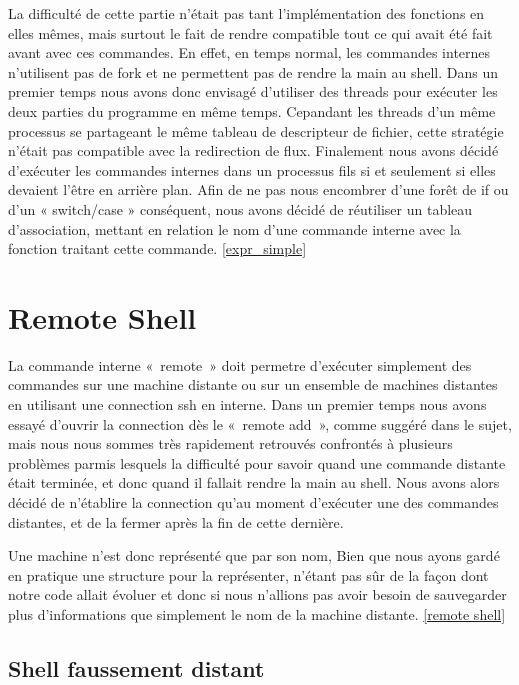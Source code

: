 \documentclass[12pt]{article}
\begin{document}
 La difficulté de cette partie n'était pas tant l'implémentation des fonctions en elles mêmes,
 mais surtout le fait de rendre compatible tout ce qui avait été fait avant avec ces commandes.
 En effet, en temps normal, les commandes internes n'utilisent pas de fork et ne permettent pas
 de rendre la main au shell. Dans un premier temps nous avons donc envisagé d'utiliser des threads
 pour exécuter les deux parties du programme en même temps. Cepandant les threads d'un même processus
 se partageant le même tableau de descripteur de fichier, cette stratégie n'était pas compatible
 avec la redirection de flux. Finalement nous avons décidé d'exécuter les commandes internes dans
 un processus fils si et seulement si elles devaient l'être en arrière plan.
 Afin de ne pas nous encombrer d'une forêt de if ou d'un « switch/case » conséquent, nous avons
 décidé de réutiliser un tableau d'association, mettant en relation le nom d'une commande interne
 avec la fonction traitant cette commande.  \ref{expr_simple}
 

\newpage
\section{Remote Shell}

La commande interne «~remote~» doit permetre d'exécuter simplement des commandes sur une machine
distante ou sur un ensemble de machines distantes en utilisant une connection ssh en interne. Dans un premier 
temps nous avons essayé d'ouvrir la connection dès le «~remote add~», comme suggéré dans le 
sujet, mais nous nous sommes très rapidement retrouvés confrontés à plusieurs problèmes parmis lesquels
la difficulté pour savoir quand une commande distante était terminée, et donc quand
il fallait rendre la main au shell. Nous avons alors décidé de n'établire la connection qu'au moment
d'exécuter une des commandes distantes, et de la fermer après la fin de cette dernière.\newline

Une machine n'est donc représenté que par son nom, Bien que nous ayons gardé en pratique une
structure pour la représenter, n'étant pas sûr de la façon dont notre code allait évoluer et
donc si nous n'allions pas avoir besoin de sauvegarder plus d'informations que simplement le
nom de la machine distante. \ref{remote shell}


\subsection{Shell faussement distant}
\end{document}
